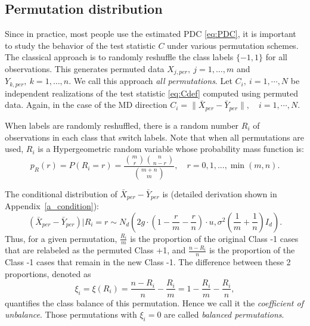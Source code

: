 \documentclass[12pt]{article}
\begin{document}
{
\subsection{Permutation distribution}
\label{Permutation distribution-f}
Since in practice, most people use the estimated PDC \eqref{eq:PDC}, it is important to study the behavior of the test statistic $C$ under various permutation schemes. 
The classical approach is to randomly reshuffle the class labels $\{-1,1\}$ for all observations. This generates {permuted data} $X_{j,per},\ j=1,\ldots,m$ and $Y_{k,per},\ k=1,\ldots,n$.  We call this approach {\em all permutations}. Let $C_i,\ i=1,\cdots, N$ be independent realizations of the test statistic \eqref{eq:Cdef} computed using permuted data. Again, in the case of the MD direction 
$%
C_i=\|\bar X_{per} - \bar Y_{per}\|,\quad i=1, \cdots, N.
$ %

When labels are randomly reshuffled, there is a random number $R_i$ of observations in each class that switch labels. Note that when all permutations are used, $R_i$  is a Hypergeometric random variable whose probability mass function is:
\[
p_R(r)=P(R_i=r)=\frac{{m\choose r}{n\choose n-r}}{{m+n\choose m}},\quad r=0, 1, ..., \min(m,n). \label{rrrr}
\]

The conditional distribution of  $\bar X_{per}- \bar Y_{per}$ is (detailed derivation shown in  Appendix~\ref{a_condition}):
\begin{equation}
\label{gor}
(\bar X_{per}- \bar Y_{per})|R_i=r\sim N_d(2g\cdot (1-\frac{r}{m}-\frac{r}{n}) \cdot u, \sigma^2 (\frac{1}{m}+\frac{1}{n}) I_d).
\end{equation}
Thus, for a given permutation, $\frac{R_i}{m}$ is the proportion of the original Class -1 cases that are relabeled as the permuted Class +1, and $\frac{n-R_i}{n}$ is the proportion of the Class -1 cases that remain in the new Class -1. The difference between these 2 proportions, denoted as
\begin{equation}
\label{cou}
\xi_i=\xi(R_i)=\frac{n-R_i}{n}-\frac{R_i}{m}=1-\frac{R_i}{m}-\frac{R_i}{n},
\end{equation}
quantifies the class balance of this permutation. Hence we call it the \textit{coefficient of unbalance}. Those permutations with $\xi_i=0$ are  called \textit{balanced permutations}.

}
\end{document}
